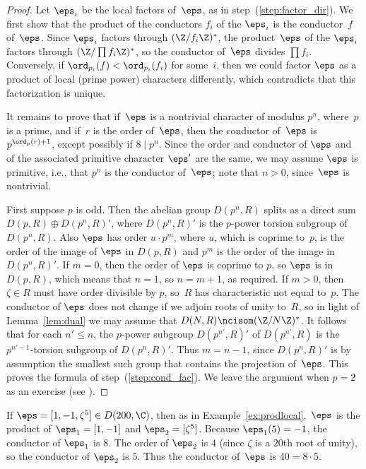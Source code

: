 \begin{proof}
Let $\eps_i$ be the local factors of~$\eps$, as in step~(\ref{step:factor_dir}).
We first show that the product of the conductors $f_i$ of the $\eps_i$ is
the conductor~$f$ of~$\eps$.  Since $\eps_i$ factors through $(\Z/f_i\Z)^*$,
the product~$\eps$ of the $\eps_i$ factors through $(\Z/\prod f_i\Z)^*$,
so the conductor of~$\eps$ divides $\prod f_i$.  Conversely, if 
$\ord_{p_i}(f) < \ord_{p_i}(f_i)$ for some~$i$, then we could factor $\eps$
as a product of local (prime power) characters differently, which contradicts
that this factorization is unique.

It remains to prove that if~$\eps$ is a nontrivial character of modulus
$p^n$, where~$p$ is a prime, and if~$r$ is the order of~$\eps$, then the
conductor of~$\eps$ is $p^{\ord_p(r)+1}$, except possibly if $8\mid
p^n$.  Since the order and conductor of $\eps$ and of the associated
primitive character $\eps'$ are the same, we may assume $\eps$ is
primitive, i.e., that $p^n$ is the conductor of~$\eps$; note that 
$n>0$, since~$\eps$ is nontrivial.  


First suppose $p$ is odd.
Then the abelian group $D(p^n,R)$ splits as a direct sum $D(p,R)\oplus D(p^n,R)'$,
where $D(p^n,R)'$ is the $p$-power torsion subgroup of $D(p^n,R)$.
Also $\eps$ has order $u\cdot p^m$, where $u$, which
is coprime to~$p$, is the order of the image of $\eps$
in $D(p,R)$ and $p^m$ is the order of the image in $D(p^n,R)'$.
If $m=0$, then the order of $\eps$ is coprime to $p$, so 
$\eps$ is in $D(p,R)$, which means that $n=1$,
so $n=m+1$, as required.  If $m>0$, then $\zeta\in R$ 
must have order divisible by $p$, so~$R$ has characteristic not
equal to~$p$.  The conductor of $\eps$ does not change if we
adjoin roots of unity to~$R$, so in light of Lemma~\ref{lem:dual}
we may assume that $D(N,R) \ncisom (\Z/N\Z)^*$.
It follows that for each $n'\leq n$, the $p$-power subgroup
$D(p^{n'},R)'$ of $D(p^{n'},R)$ is the $p^{n'-1}$-torsion
subgroup of $D(p^n,R)'$.   Thus $m=n-1$, since
$D(p^n,R)'$ is by assumption the smallest such group that 
contains the projection of~$\eps$.  This proves the 
formula of step~(\ref{step:cond_fac}).   We leave the argument
when $p=2$ as an exercise (see ).
\end{proof}

\begin{example}\label{ex:char_cond}
If $\eps = [1,-1,\zeta^5] \in D(200,\C)$, then
as in Example~\ref{ex:prodlocal},~$\eps$ 
is the product of $\eps_1=[1,-1]$ and $\eps_2 = [\zeta^5]$.
Because $\eps_1(5)=-1$, the conductor of $\eps_1$ is $8$.
The order of $\eps_2$ is $4$ (since $\zeta$ is a $20$th
root of unity), so the conductor of $\eps_2$ is $5$.
Thus the conductor of~$\eps$ is $40=8\cdot 5$.
\end{example}

